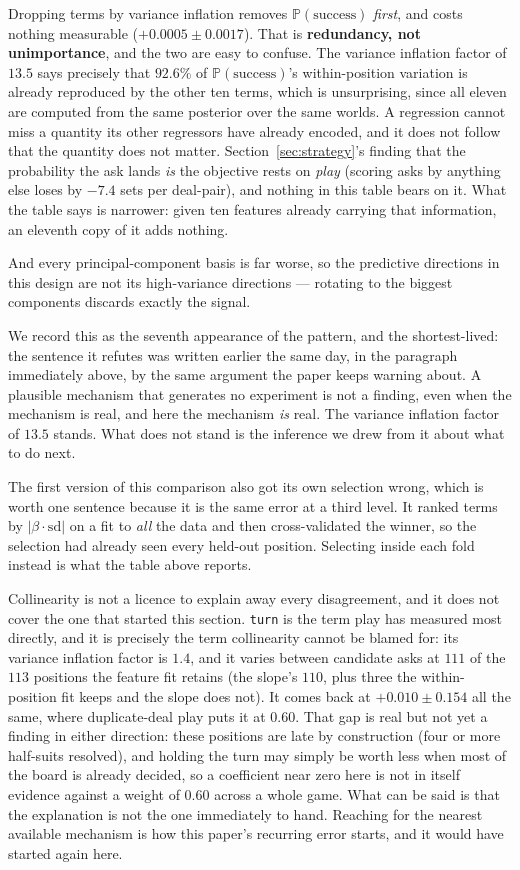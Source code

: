 \documentclass[11pt,letterpaper]{article}
\newcommand{\Prob}{\ensuremath{\mathbb{P}}}
\begin{document}
Dropping terms by variance inflation removes $\Prob(\text{success})$
\emph{first}, and costs nothing measurable ($+0.0005 \pm 0.0017$). That is
\textbf{redundancy, not unimportance}, and the two are easy to confuse. The
variance inflation factor of $13.5$ says precisely that $92.6\%$ of
$\Prob(\text{success})$'s within-position variation is already reproduced by the
other ten terms, which is unsurprising, since all eleven are computed from the
same posterior over the same worlds. A regression cannot miss a quantity its
other regressors have already encoded, and it does not follow that the quantity
does not matter. Section~\ref{sec:strategy}'s finding that the probability the ask
lands \emph{is} the objective rests on \emph{play} (scoring asks by anything
else loses by $-7.4$ sets per deal-pair), and nothing in this table bears on
it. What the table says is narrower: given ten features already carrying that
information, an eleventh copy of it adds nothing.

And every principal-component basis is far worse, so the predictive directions in
this design are not its high-variance directions --- rotating to the biggest
components discards exactly the signal.

We record this as the seventh appearance of the pattern, and the shortest-lived:
the sentence it refutes was written earlier the same day, in the paragraph
immediately above, by the same argument the paper keeps warning about. A
plausible mechanism that generates no experiment is not a finding, even when the
mechanism is real, and here the mechanism \emph{is} real. The variance
inflation factor of $13.5$ stands. What does not stand is the inference we drew
from it about what to do next.

The first version of this comparison also got its own selection wrong, which is
worth one sentence because it is the same error at a third level. It ranked
terms by $|\beta \cdot \mathrm{sd}|$ on a fit to \emph{all} the data and then
cross-validated the winner, so the selection had already seen every held-out
position. Selecting inside each fold instead is what the table above reports.

Collinearity is not a licence to explain away every disagreement, and it does not
cover the one that started this section. \texttt{turn} is the term play has
measured most directly, and it is precisely the term collinearity cannot be
blamed for: its variance inflation factor is $1.4$, and it varies between
candidate asks at $111$ of the $113$ positions the feature fit retains (the
slope's $110$, plus three the within-position fit keeps and the slope does not). It comes back at
$+0.010 \pm 0.154$ all the same, where duplicate-deal play puts it at $0.60$.
That gap is real but not yet a finding in either direction: these positions are
late by construction (four or more half-suits resolved), and holding the turn may
simply be worth less when most of the board is already decided, so a coefficient
near zero here is not in itself evidence against a weight of $0.60$ across a whole
game. What can be said is that the explanation is not the one immediately to
hand. Reaching for the nearest available mechanism is how this paper's recurring
error starts, and it would have started again here.
\end{document}
